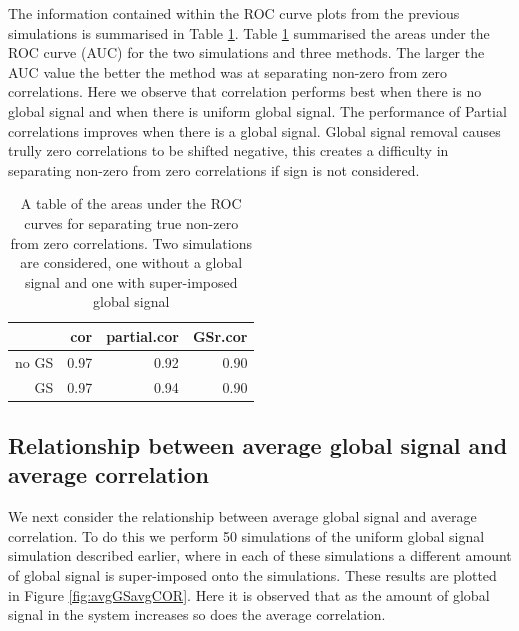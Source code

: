 \documentclass[a4paper]{article}\usepackage[]{graphicx}\usepackage[]{color}
\begin{document}
The information contained within the ROC curve plots from the previous simulations is summarised in Table \ref{auROC}. Table \ref{auROC} 
 summarised the areas under the ROC curve (AUC) for the two simulations and three methods. The larger the AUC value the better the method was at separating non-zero from zero correlations. Here we observe that correlation performs best when there is no global signal and when there is uniform global signal. The performance of Partial correlations improves when there is a global signal. Global signal removal causes trully zero correlations to be shifted negative, this creates a difficulty in separating non-zero from zero correlations if sign is not considered.
\begin{table}[ht]
\centering
\begin{tabular}{rrrr}
  \hline
 & cor & partial.cor & GSr.cor \\ 
  \hline
no GS & 0.97 & 0.92 & 0.90 \\ 
  GS & 0.97 & 0.94 & 0.90 \\ 
   \hline
\end{tabular}
\caption{A table of the areas under the ROC curves for separating true non-zero from zero correlations. Two simulations are considered, one without a global signal and one with super-imposed global signal} 
\label{auROC}
\end{table}


\clearpage
\subsection{Relationship between average global signal and average correlation}

We next consider the relationship between average global signal and average correlation. To do this we perform 50 simulations of the uniform global signal simulation described earlier, where in each of these simulations a different amount of global signal is super-imposed onto the simulations. These results are plotted in Figure \ref{fig:avgGSavgCOR}. Here it is observed that as the amount of global signal in the system increases so does the average correlation.
\end{document}
